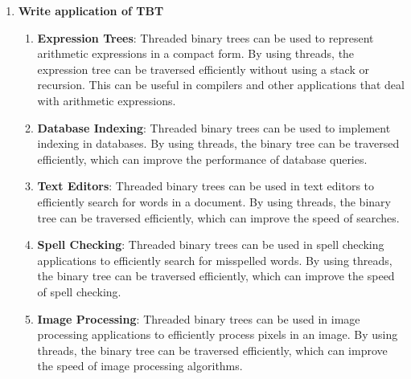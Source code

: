 \documentclass[11pt]{article}
\begin{document}
\begin{enumerate}
    \item \textbf{Write application of TBT}\\

          \begin{enumerate}
              \item \textbf{Expression Trees}: Threaded binary trees can be used to represent arithmetic expressions in a compact form. By using threads, the expression tree can be traversed efficiently without using a stack or recursion. This can be useful in compilers and other applications that deal with arithmetic expressions.

              \item \textbf{Database Indexing}: Threaded binary trees can be used to implement indexing in databases. By using threads, the binary tree can be traversed efficiently, which can improve the performance of database queries.

              \item \textbf{Text Editors}: Threaded binary trees can be used in text editors to efficiently search for words in a document. By using threads, the binary tree can be traversed efficiently, which can improve the speed of searches.

              \item \textbf{Spell Checking}: Threaded binary trees can be used in spell checking applications to efficiently search for misspelled words. By using threads, the binary tree can be traversed efficiently, which can improve the speed of spell checking.

              \item \textbf{Image Processing}: Threaded binary trees can be used in image processing applications to efficiently process pixels in an image. By using threads, the binary tree can be traversed efficiently, which can improve the speed of image processing algorithms.

          \end{enumerate}

\end{enumerate}
\end{document}
